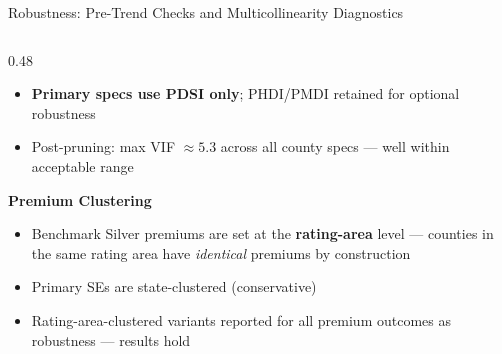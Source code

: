 \documentclass[aspectratio=169,11pt]{beamer}
\newcommand{\emphcolor}[1]{{\color{WarmOrange}\textbf{#1}}}
\newcommand{\tealtext}[1]{{\color{Teal}#1}}
\begin{document}
\begin{frame}[shrink=20]{Robustness: Pre-Trend Checks and Multicollinearity Diagnostics}
\begin{columns}[T]
\begin{column}{0.48\textwidth}
\begin{itemize}
        \item \emphcolor{Primary specs use PDSI only}; PHDI/PMDI retained for optional robustness
        \item Post-pruning: max VIF $\approx 5.3$ across all county specs --- well within acceptable range
      \end{itemize}
      \vspace{0.3em}
      \textbf{\tealtext{Premium Clustering}}\\[0.2em]
      \begin{itemize}\itemsep0.15em
        \item Benchmark Silver premiums are set at the \emphcolor{rating-area} level --- counties in the same rating area have \emph{identical} premiums by construction
        \item Primary SEs are state-clustered (conservative)
        \item Rating-area-clustered variants reported for all premium outcomes as robustness --- results hold
      \end{itemize}
    \end{column}
  \end{columns}
\end{frame}
\end{document}
